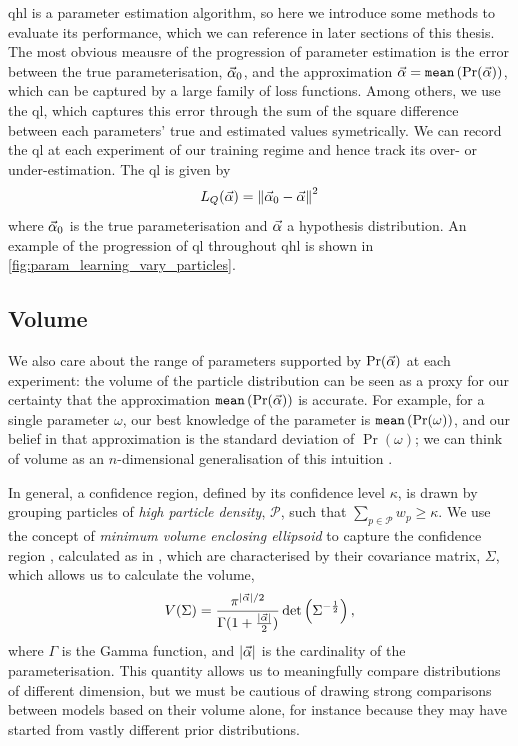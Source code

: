 \gls{qhl} is a parameter estimation algorithm, so here we introduce some methods to evaluate its performance, 
    which we can reference in later sections of this thesis. 
The most obvious meausre of the progression of parameter estimation is the error between the true parameterisation, 
    $\vec{\alpha}_0$, and the approximation $\vec{\alpha} = \texttt{mean} \left( \Pr(\vec{\alpha}) \right)$,
    which can be captured by a large family of loss functions. 
Among others, we use the \gls{ql}, which captures this error through the sum of the square difference between 
    each parameters' true and estimated values symetrically.
We can record the \gls{ql} at each \gls{experiment} of our training regime and hence track its over- or under-estimation. 
The \gls{ql} is given by 
    \begin{equation}
        \label{eqn:quadratic_loss}
        L_{Q}(\vec{\alpha}) = \left\| \vec{\alpha}_0 - \vec{\alpha} \right\|^2
    \end{equation}
    where $\vec{\alpha}_0$ is the true parameterisation and $\vec{\alpha}$ a hypothesis distribution.
An example of the progression of \gls{ql} throughout \gls{qhl} is shown in \cref{fig:param_learning_vary_particles}.
\par 

\subsection{Volume}\label{sec:volume}
We also care about the range of parameters supported by $\Pr(\vec{\alpha})$ at each experiment: 
    the \gls{volume} of the \gls{particle} distribution can be seen as a proxy for our certainty
    that the approximation $\texttt{mean}\left(\Pr(\vec{\alpha})\right) $ is accurate. 
For example, for a single parameter $\omega$, our best knowledge of the parameter is $\texttt{mean}\left( \Pr(\omega) \right)$, 
    and our belief in that approximation is the standard deviation of $\Pr(\omega)$; 
    we can think of \gls{volume} as an $n$-dimensional generalisation of this intuition \cite{qinfer-1_0, ferrie2014high}. 
\par 
In general, a confidence region, defined by its confidence level $\kappa$, is drawn by grouping \glspl{particle} 
    of \emph{high \gls{particle} density}, $\mathcal{P}$, such that $\sum\limits_{p \in \mathcal{P}} w_{p} \geq \kappa$.
We use the concept of \emph{minimum volume enclosing ellipsoid}
    to capture the confidence region \cite{ferrie2014high}, calculated as in \cite{todd2007khachiyan}, 
    which are characterised by their covariance matrix, $\Sigma$, which allows us to calculate the \gls{volume}, 
    \begin{equation}
        \label{eqn:volume}
        V(\Sigma) = \frac{ \pi^{| \vec{\alpha} | / 2}}{ \Gamma(1 + \frac{| \vec{\alpha} |}{2})} \det\left(\Sigma^{-\frac{1}{2}}\right),
    \end{equation}
    where $\Gamma$ is the Gamma function, and $|\vec{\alpha}|$ is the cardinality of the parameterisation. 
This quantity allows us to meaningfully compare distributions of different dimension, 
    but we must be cautious of drawing strong comparisons between models based on 
    their \gls{volume} alone, for instance because they may have started from vastly different prior distributions. 
\par 

